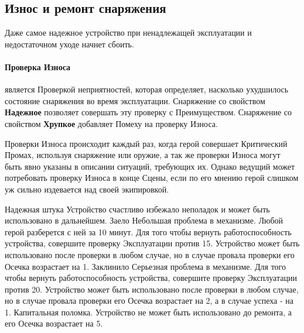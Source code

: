 \subsection{Износ и ремонт снаряжения}
Даже самое надежное устройство при ненадлежащей эксплуатации и недостаточном уходе начнет сбоить.
\paragraph{Проверка Износа} является Проверкой неприятностей, которая определяет, насколько ухудшилось состояние снаряжения во время эксплуатации.
\newline Снаряжение со свойством \textbf{Надежное} позволяет совершать эту проверку с Преимуществом.
\newline Снаряжение со свойством \textbf{Хрупкое} добавляет Помеху на проверку Износа.
\begin{tcolorbox}
Проверки Износа происходит каждый раз, когда герой совершает Критический Промах, используя снаряжение или оружие, а так же проверки Износа могут быть явно указаны в описании ситуаций, требующих их. Однако ведущий может потребовать проверку Износа в конце Сцены, если по его мнению герой слишком уж сильно издевается над своей экипировкой.
\end{tcolorbox}
\trouble
{Надежная штука}%
{Устройство счастливо избежало неполадок и может быть использовано в дальнейшем.}%
{Заело}%
{Небольшая проблема в механизме. Любой герой разберется с ней за 10 минут. Для того чтобы вернуть работоспособность устройства, совершите проверку Эксплуатации против 15. Устройство может быть использовано после проверки в любом случае, но в случае провала проверки его Осечка возрастает на 1.}%
{Заклинило}%
{Серьезная проблема в механизме. Для того чтобы вернуть работоспособность устройства, совершите проверку Эксплуатации против 20. Устройство может быть использовано после проверки в любом случае, но в случае провала проверки его Осечка возрастает на 2, а в случае успеха - на 1.}%
{Капитальная поломка.}%
{Устройство не может быть использовано до ремонта, а его Осечка возрастает на 5.}%
